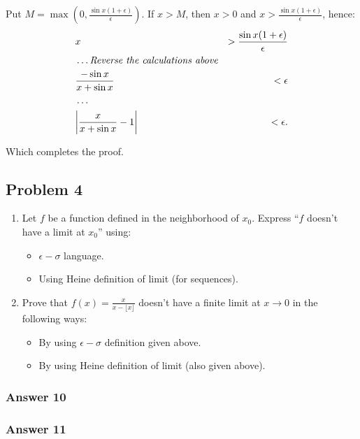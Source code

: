 \documentclass[11pt]{article}
\begin{document}
Put $M = \max\left(0, \frac{\sin x(1 + \epsilon)}{\epsilon}\right)$. If $x > M$, then
$x > 0$ and $x > \frac{\sin x(1 + \epsilon)}{\epsilon}$, hence:
\begin{equation*}
  \begin{aligned}
    &x                              &> \frac{\sin x(1 + \epsilon)}{\epsilon} \\
    &\hdots \textit{Reverse the calculations above} \\
    &\frac{-\sin x}{x + \sin x}     &< \epsilon \\
    &\hdots \\
    &\abs{\frac{x}{x + \sin x} - 1} &< \epsilon.
  \end{aligned}
\end{equation*}

Which completes the proof.
\subsection{Problem 4}
\label{sec-1-4}
\begin{enumerate}
\item Let $f$ be a function defined in the neighborhood of $x_0$.
Express ``$f$ doesn't have a limit at $x_0$'' using:
\begin{itemize}
\item $\epsilon-\sigma$ language.
\item Using Heine definition of limit (for sequences).
\end{itemize}

\item Prove that $f(x) = \frac{x}{x - \lfloor x \rfloor}$ doesn't have
a finite limit at $x \to 0$ in the following ways:
\begin{itemize}
\item By using $\epsilon-\sigma$ definition given above.
\item By using Heine definition of limit (also given above).
\end{itemize}
\end{enumerate}

\subsubsection{Answer 10}
\label{sec-1-4-1}

\subsubsection{Answer 11}
\label{sec-1-4-2}
\end{document}
